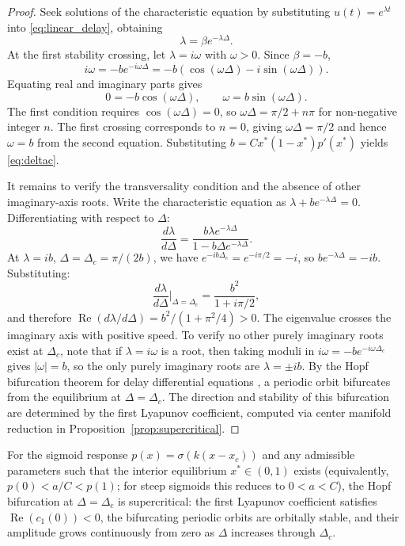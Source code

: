 \begin{proof}
Seek solutions of the characteristic equation by substituting $u(t)=e^{\lambda t}$ into \eqref{eq:linear_delay}, obtaining
\[
\lambda=\beta e^{-\lambda\Delta}.
\]
At the first stability crossing, let $\lambda=i\omega$ with $\omega>0$. Since $\beta=-b$,
\[
i\omega=-b e^{-i\omega\Delta}=-b(\cos(\omega\Delta)-i\sin(\omega\Delta)).
\]
Equating real and imaginary parts gives
\[
0=-b\cos(\omega\Delta),\qquad \omega=b\sin(\omega\Delta).
\]
The first condition requires $\cos(\omega\Delta)=0$, so $\omega\Delta=\pi/2+n\pi$ for non-negative integer $n$. The first crossing corresponds to $n=0$, giving $\omega\Delta=\pi/2$ and hence $\omega=b$ from the second equation. Substituting $b=Cx^*(1-x^*)p'(x^*)$ yields \eqref{eq:deltac}.

It remains to verify the transversality condition and the absence of other imaginary-axis roots. Write the characteristic equation as $\lambda+be^{-\lambda\Delta}=0$. Differentiating with respect to $\Delta$:
\[
\frac{d\lambda}{d\Delta}=\frac{b\lambda e^{-\lambda\Delta}}{1-b\Delta e^{-\lambda\Delta}}.
\]
At $\lambda=ib$, $\Delta=\Delta_c=\pi/(2b)$, we have $e^{-ib\Delta_c}=e^{-i\pi/2}=-i$, so $be^{-\lambda\Delta}=-ib$. Substituting:
\[
\frac{d\lambda}{d\Delta}\bigg|_{\Delta=\Delta_c}=\frac{b^2}{1+i\pi/2},
\]
and therefore $\operatorname{Re}(d\lambda/d\Delta)=b^2/(1+\pi^2/4)>0$. The eigenvalue crosses the imaginary axis with positive speed. To verify no other purely imaginary roots exist at $\Delta_c$, note that if $\lambda=i\omega$ is a root, then taking moduli in $i\omega=-be^{-i\omega\Delta_c}$ gives $|\omega|=b$, so the only purely imaginary roots are $\lambda=\pm ib$. By the Hopf bifurcation theorem for delay differential equations \citep{kuang1993delay}, a periodic orbit bifurcates from the equilibrium at $\Delta=\Delta_c$. The direction and stability of this bifurcation are determined by the first Lyapunov coefficient, computed via center manifold reduction in Proposition~\ref{prop:supercritical}.
\end{proof}

\begin{proposition}
\label{prop:supercritical}
For the sigmoid response $p(x)=\sigma(k(x-x_c))$ and any admissible parameters such that the interior equilibrium $x^*\in(0,1)$ exists (equivalently, $p(0)<a/C<p(1)$; for steep sigmoids this reduces to $0<a<C$), the Hopf bifurcation at $\Delta=\Delta_c$ is supercritical: the first Lyapunov coefficient satisfies $\operatorname{Re}(c_1(0))<0$, the bifurcating periodic orbits are orbitally stable, and their amplitude grows continuously from zero as $\Delta$ increases through $\Delta_c$.
\end{proposition}

